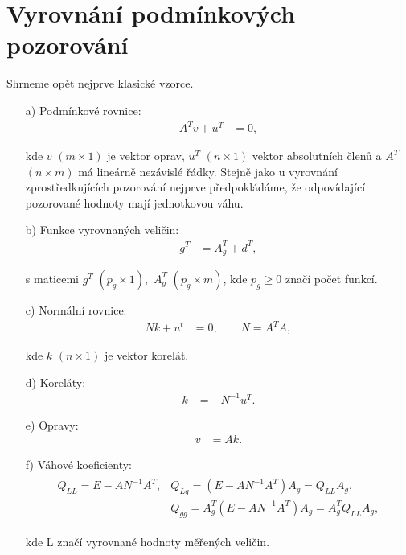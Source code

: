 \section{Vyrovnání podmínkových pozorování}

Shrneme  opět nejprve klasické vzorce.

\begin{itemize}
\setlength{\abovedisplayskip}{0pt}
\setlength{\belowdisplayskip}{3pt}

\item[a)] Podmínkové rovnice:
%
  \begin{align*}
    \tag{3.21} A^Tv + u^T &= 0,
  \end{align*}

  kde $v$ $(m \times 1)$ je vektor oprav, $u^T$ $(n \times 1)$ vektor
  absolutních členů a $A^T$ $(n \times m)$ má lineárně nezávislé
  řádky. Stejně jako u vyrovnání zprostředkujících pozorování nejprve
  předpokládáme, že odpovídající pozorované hodnoty mají jednotkovou
  váhu.

\item[b)] Funkce vyrovnaných veličin:
%
  \begin{align*}
    \tag{3.22}   g^T &= A^T_g + d^T,
  \end{align*}

  s maticemi $g^T$ $(p_g \times 1),$ $A^T_g$ $(p_g \times m)$, kde
  $p_g \ge 0$ značí počet funkcí.

\item[c)] Normální rovnice:
%
  \begin{align*}
    \tag{3.23}   N k + u^t &= 0, \qquad N = A^TA,
  \end{align*}

  kde $k$ $(n \times 1)$ je vektor korelát.

\item[d)] Koreláty:
%
  \begin{align*}
    \tag{3.24}  k &= -N^{-1}u^T.
  \end{align*}

\item[e)] Opravy:
  \begin{align*}
    \tag{3.25}  v &= Ak.
  \end{align*}

\item[f)] Váhové koeficienty:
%
  \begin{align*}
    \begin{array}{ll}
    \tag{3.26}
    Q_{LL} = E - AN^{-1}A^T, &
               Q_{Lg} = (E - AN^{-1}A^T)A_g = Q_{LL}A_g,\\
      &Q_{gg} = A^T_g (E - AN^{-1}A^T)A_g = A^T_g Q_{LL}A_g,
    \end{array}
  \end{align*}

  kde L značí vyrovnané hodnoty měřených veličin.
\end{itemize}


